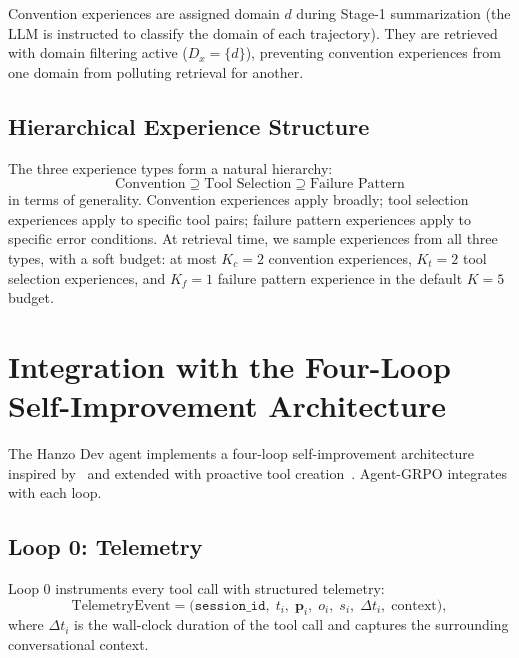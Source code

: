 \documentclass[11pt]{article}
\begin{document}
Convention experiences are assigned domain $d$ during Stage-1 summarization
(the LLM is instructed to classify the domain of each trajectory). They are
retrieved with domain filtering active ($D_x = \{d\}$), preventing convention
experiences from one domain from polluting retrieval for another.

\subsection{Hierarchical Experience Structure}

The three experience types form a natural hierarchy:
\begin{equation}
    \text{Convention} \supseteq \text{Tool Selection} \supseteq \text{Failure Pattern}
\end{equation}
in terms of generality. Convention experiences apply broadly; tool selection
experiences apply to specific tool pairs; failure pattern experiences apply
to specific error conditions. At retrieval time, we sample experiences from
all three types, with a soft budget: at most $K_c = 2$ convention experiences,
$K_t = 2$ tool selection experiences, and $K_f = 1$ failure pattern experience
in the default $K = 5$ budget.

\section{Integration with the Four-Loop Self-Improvement Architecture}
\label{sec:integration}

The Hanzo Dev agent implements a four-loop self-improvement architecture
inspired by~\cite{shinn2023reflexion} and extended with proactive tool
creation~\cite{wang2023voyager}. Agent-GRPO integrates with each loop.

\subsection{Loop 0: Telemetry}

Loop 0 instruments every tool call with structured telemetry:
\begin{equation}
    \text{TelemetryEvent} = \bigl(\texttt{session\_id},\; t_i,\; \bm{p}_i,\; o_i,\; s_i,\; \Delta t_i,\; \text{context}\bigr),
    \label{eq:telemetry}
\end{equation}
where $\Delta t_i$ is the wall-clock duration of the tool call and 
captures the surrounding conversational context.
\end{document}
